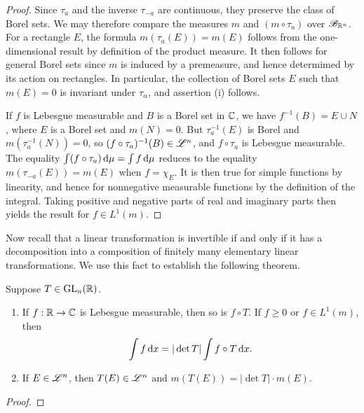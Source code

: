 \documentclass[12pt]{article} %
\begin{document}
\begin{proof}
    Since $\tau_a$ and the inverse $\tau_{-a}$ are continuous, they preserve the class of Borel sets. We may therefore compare the measures $m$ and $(m \circ \tau_a)$ over $\mathscr{B}_{\mathbb{R}^n}$. For a rectangle $E$, the formula $m(\tau_a(E)) = m(E)$ follows from the one-dimensional result by definition of the product measure. It then follows for general Borel sets since $m$ is induced by a premeasure, and hence determimed by its action on rectangles. In particular, the collection of Borel sets $E$ such that $m(E) = 0$ is invariant under $\tau_\alpha$, and assertion (i) follows.

    If $f$ is Lebesgue measurable and $B$ is a Borel set in $\mathbb{C}$, we have $f^{-1}(B) = E \cup N$, where $E$ is a Borel set and $m(N) = 0$. But $\tau_a^{-1}(E)$ is Borel and $m(\tau_a^{-1}(N)) = 0$, so $(f \circ \tau_a)^{-1}(B) \in \mathscr{L}^n$, and $f \circ \tau_a$ is Lebesgue measurable. The equality $\int (f \circ \tau_a) \, \mathrm{d} \mu = \int f \, \mathrm{d} \mu$ reduces to the equality $m(\tau_{-a}(E)) = m(E)$ when $f = \chi_E$. It is then true for simple functions by linearity, and hence for nonnegative measurable functions by the definition of the integral. Taking positive and negative parts of real and imaginary parts then yields the result for $f \in L^1(m)$.
\end{proof}

Now recall that a linear transformation is invertible if and only if it has a decomposition into a composition of finitely many elementary linear transformations. We use this fact to establish the following theorem.

\begin{theorem}\label{thm:2.44}
    Suppose $T \in \operatorname{GL}_n(\mathbb{R})$. \begin{enumerate}
        \item If $f : \mathbb{R} \to \mathbb{C}$ is Lebesgue measurable, then so is $f \circ T$. If $f \geq 0$ or $f \in L^1(m)$, then \begin{align*}
            \int f \, \mathrm{d} x = |\det T| \int f \circ T \, \mathrm{d} x.
        \end{align*}
        \item If $E \in \mathscr{L}^n$, then $T(E) \in \mathscr{L}^n$ and $m(T(E)) = |\det T| \cdot m(E)$.
    \end{enumerate}
\end{theorem}

\begin{proof}
\end{proof}
\end{document}
